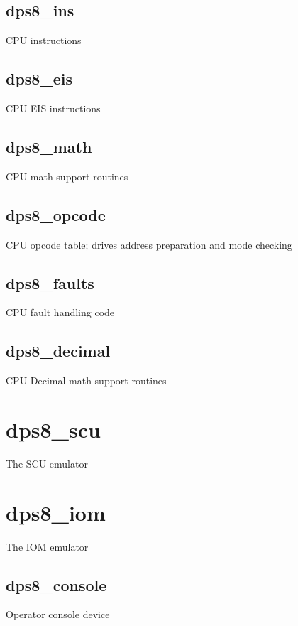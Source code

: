 \documentclass[notitlepage]{report}
\begin{document}
\subsection{dps8\_ins}

CPU instructions

\subsection{dps8\_eis}

CPU EIS instructions

\subsection{dps8\_math}

CPU math support routines

\subsection{dps8\_opcode}

CPU opcode table; drives address preparation and mode checking

\subsection{dps8\_faults}

CPU fault handling code

\subsection{dps8\_decimal}

CPU Decimal math support routines

\section{dps8\_scu}

The SCU emulator

\section{dps8\_iom}

The IOM emulator

\subsection{dps8\_console}

Operator console device
\end{document}
